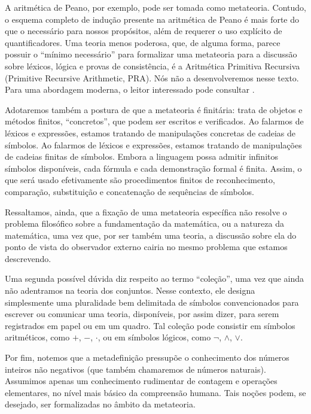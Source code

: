 A aritmética de Peano, por exemplo, pode ser tomada como metateoria.
Contudo, o esquema completo de indução presente na aritmética de Peano é mais forte do que o necessário para nossos propósitos, além de requerer o uso explícito de quantificadores.
Uma teoria menos poderosa, que, de alguma forma, parece possuir o ``mínimo necessário'' para formalizar uma metateoria para a discussão sobre léxicos, lógica e provas de consistência, é a Aritmética Primitiva Recursiva (Primitive Recursive Arithmetic, PRA).
Nós não a desenvolveremos nesse texto.
Para uma abordagem moderna, o leitor interessado pode consultar \cite{avigad2022mathematical}.

Adotaremos também a postura de que a metateoria é finitária: trata de objetos e métodos finitos, ``concretos'', que podem ser escritos e verificados.
Ao falarmos de léxicos e expressões, estamos tratando de manipulações concretas de cadeias de símbolos.
Ao falarmos de léxicos e expressões, estamos tratando de manipulações de cadeias finitas de símbolos. 
Embora a linguagem possa admitir infinitos símbolos disponíveis, cada fórmula e cada demonstração formal é finita. 
Assim, o que será usado efetivamente são procedimentos finitos de reconhecimento, comparação, substituição e concatenação de sequências de símbolos.

Ressaltamos, ainda, que a fixação de uma metateoria específica não resolve o problema filosófico sobre a fundamentação da matemática, ou a natureza da matemática, uma vez que, por ser também uma teoria, a discussão sobre ela do ponto de vista do observador externo cairia no mesmo problema que estamos descrevendo.

Uma segunda possível dúvida diz respeito ao termo ``coleção'', uma vez que ainda não adentramos na teoria dos conjuntos.
Nesse contexto, ele designa simplesmente uma pluralidade bem delimitada de símbolos convencionados para escrever ou comunicar uma teoria, disponíveis, por assim dizer, para serem registrados em papel ou em um quadro.
Tal coleção pode consistir em símbolos aritméticos, como $+$, $-$, $\cdot$, ou em símbolos lógicos, como $\neg$, $\wedge$, $\vee$.

Por fim, notemos que a metadefinição pressupõe o conhecimento dos números inteiros não negativos (que também chamaremos de números naturais).
Assumimos apenas um conhecimento rudimentar de contagem e operações elementares, no nível mais básico da compreensão humana.
Tais noções podem, se desejado, ser formalizadas no âmbito da metateoria.

